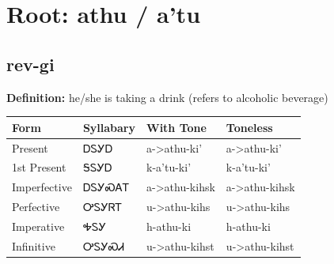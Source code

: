 \documentclass{article}%
\begin{document}
%
\normalsize%
\section*{Root: athu / a'tu}%
\subsection*{rev-gi}%
\textbf{Definition: }%
he/she is taking a drink (refers to alcoholic beverage)%
\\[0.5em]%
\begin{tabular}{|l|l|l|l|}%
\hline%
\textbf{Form}&\textbf{Syllabary}&\textbf{With Tone}&\textbf{Toneless}\\%
\hline%
Present&ᎠᏚᎩᎠ&a{-}>athu{-}ki'&a{-}>athu{-}ki'\\%
1st Present&ᎦᏚᎩᎠ&k{-}a'tu{-}ki'&k{-}a'tu{-}ki'\\%
Imperfective&ᎠᏚᎩᏍᎪᎢ&a{-}>athu{-}kihsk&a{-}>athu{-}kihsk\\%
Perfective&ᎤᏚᎩᏒᎢ&u{-}>athu{-}kihs&u{-}>athu{-}kihs\\%
Imperative&ᎭᏚᎩ&h{-}athu{-}ki&h{-}athu{-}ki\\%
Infinitive&ᎤᏚᎩᏍᏗ&u{-}>athu{-}kihst&u{-}>athu{-}kihst\\%
\hline%
\end{tabular}%
\\[1em]%
\end{document}
